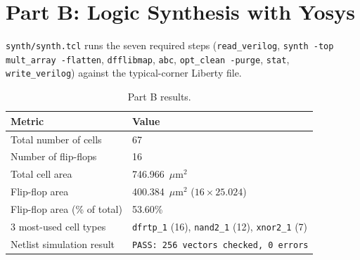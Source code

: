 \documentclass[11pt,a4paper]{article}
\newcommand{\cell}[1]{\texttt{#1}}
\newcommand{\umsq}{\ensuremath{\mu\mathrm{m}^2}}
\begin{document}
\section{Part B: Logic Synthesis with Yosys}

\texttt{synth/synth.tcl} runs the seven required steps (\texttt{read\_verilog},
\texttt{synth -top mult\_array -flatten}, \texttt{dfflibmap}, \texttt{abc},
\texttt{opt\_clean -purge}, \texttt{stat}, \texttt{write\_verilog}) against the
typical-corner Liberty file.

\begin{table}[H]
\centering
\begin{tabular}{ll}
\toprule
Metric & Value \\
\midrule
Total number of cells & 67 \\
Number of flip-flops & 16 \\
Total cell area & 746.966~\umsq{} \\
Flip-flop area & 400.384~\umsq{} ($16 \times 25.024$) \\
Flip-flop area (\% of total) & 53.60\% \\
3 most-used cell types & \cell{dfrtp\_1} (16), \cell{nand2\_1} (12), \cell{xnor2\_1} (7) \\
Netlist simulation result & \texttt{PASS: 256 vectors checked, 0 errors} \\
\bottomrule
\end{tabular}
\caption{Part B results.}
\end{table}
\end{document}
